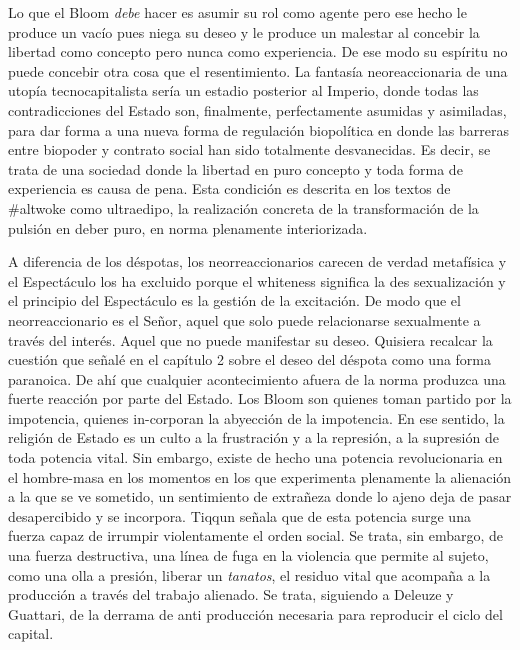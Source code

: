Lo que el Bloom \emph{debe} hacer es asumir su rol como agente pero ese hecho le produce un vacío pues niega su deseo y le produce un malestar al concebir la libertad como concepto pero nunca como experiencia. De ese modo su espíritu no puede concebir otra cosa que el resentimiento. La fantasía neoreaccionaria de una utopía tecnocapitalista sería un estadio posterior al Imperio, donde todas las contradicciones del Estado son, finalmente, perfectamente asumidas y asimiladas, para dar forma a una nueva forma de regulación biopolítica en donde las barreras entre biopoder y contrato social han sido totalmente desvanecidas. Es decir, se trata de una sociedad donde la libertad en puro concepto y toda forma de experiencia es causa de pena. Esta condición es descrita en los textos de \#altwoke como ultraedipo, la realización concreta de la transformación de la pulsión en deber puro, en norma plenamente interiorizada.

A diferencia de los déspotas, los neorreaccionarios carecen de verdad metafísica y el Espectáculo los ha excluido porque el whiteness significa la des sexualización y el principio del Espectáculo es la gestión de la excitación. De modo que el neorreaccionario es el Señor, aquel que solo puede relacionarse sexualmente a través del interés. Aquel que no puede manifestar su deseo. Quisiera recalcar la cuestión que señalé en el capítulo 2 sobre el deseo del déspota como una forma paranoica. De ahí que cualquier acontecimiento afuera de la norma produzca una fuerte reacción por parte del Estado. Los Bloom son quienes toman partido por la impotencia, quienes in-corporan la abyección de la impotencia. En ese sentido, la religión de Estado es un culto a la frustración y a la represión, a la supresión de toda potencia vital. Sin embargo, existe de hecho una potencia revolucionaria en el hombre-masa en los momentos en los que experimenta plenamente la alienación a la que se ve sometido, un sentimiento de extrañeza donde lo ajeno deja de pasar desapercibido y se incorpora. Tiqqun señala que de esta potencia surge una fuerza capaz de irrumpir violentamente el orden social. Se trata, sin embargo, de una fuerza destructiva, una línea de fuga en la violencia que permite al sujeto, como una olla a presión, liberar un \emph{tanatos}, el residuo vital que acompaña a la producción a través del trabajo alienado. Se trata, siguiendo a Deleuze y Guattari, de la derrama de anti producción necesaria para reproducir el ciclo del capital.

